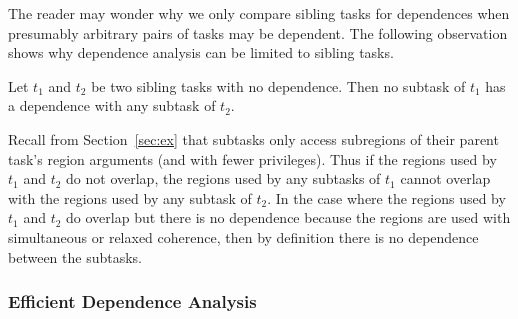 The reader may wonder why we only compare sibling tasks for
dependences when presumably arbitrary pairs of tasks may be dependent. 
The following observation shows why dependence analysis can be limited to
sibling tasks.
\begin{observation}
\label{obs:isolation}
\rm
Let $t_1$ and $t_2$ be two sibling tasks with no dependence.  Then no subtask of $t_1$ has a dependence with any subtask
of $t_2$.
\end{observation}
Recall from Section~\ref{sec:ex} that subtasks only access subregions of their parent task's region arguments (and with fewer
privileges).  Thus if the regions used by $t_1$ and $t_2$ do not overlap, the regions used by any subtasks of $t_1$ cannot
overlap with the regions used by any subtask of $t_2$.  In the case where the regions used by $t_1$ and $t_2$ do overlap
but there is no dependence because the regions are used with simultaneous or relaxed coherence, then by definition there is no dependence between the subtasks.

\subsubsection{Efficient Dependence Analysis}

